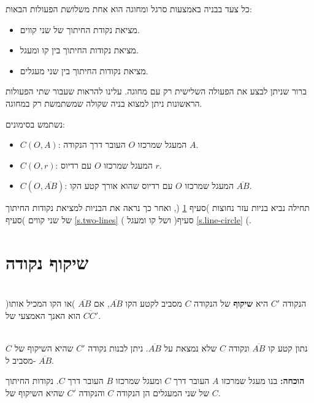 כל צעד בבניה באמצעות סרגל ומחוגה הוא אחת משלושת הפעולות הבאות:
\begin{itemize}
\item
מציאת נקודת החיתוך של שני קווים.
\item
מציאת נקודות החיתוך בין קו ומעגל.
\item
מציאת נקודות החיתוך בין שני מעגלים.
\end{itemize}
ברור שניתן לבצע את הפעולה השלישית רק עם מחוגה. עלינו להראות שעבור שתי הפעולות הראשונות ניתן למצוא בניה שקולה שמשתמשת רק במחוגה.


נשתמש בסימונים:
\begin{itemize}
\item $C(O,A)$: 
המעגל שמרכזו
$O$
העובר דרך הנקודה
$A$.
\item $C(O,r)$:
המעגל שמרכזו
$O$
עם רדיוס
$r$.
\item $C(O,\overline{AB})$:
המעגל שמרכזו
$O$
עם רדיוס שהוא אורך קטע הקו
$\overline{AB}$.
\end{itemize}

תחילה נביא בניות עזר נחוצות )סעיף
\ref{s.auxiliary}%
(,
ואחר כך נראה את הבניות למציאת נקודות החיתוך של שני קווים )סעיף
\ref{s.two-lines}%
( ושל קו ומעגל )סעיף
\ref{s.line-circle}%
(.

\section{שיקוף נקודה}\label{s.auxiliary}

\begin{definition}\mbox{}\\
הנקודה
$C'$
היא
\textbf{%
שיקוף%
}
של הנקודה
$C$
מסביב לקטע הקו
$\overline{AB}$,
אם 
$\overline{AB}$
)או הקו המכיל אותו( הוא האנך האמצעי של
$\overline{CC'}$.
\end{definition}



\begin{theorem}\mbox{}\label{thm.reflection}\\
נתון קטע קו
$\overline{AB}$
ונקודה 
$C$
שלא נמצאת על
$\overline{AB}$.
ניתן לבנות נקודה 
$C'$
שהיא השיקוף של
$C$
מסביב ל-%
$\overline{AB}$.
\end{theorem}

\textbf{הוכחה:}
בנו מעגל שמרכזו
$A$
העובר דרך
$C$
ומעגל שמרכזו
$B$
העובר דרך
$C$.
נקודות החיתוך של שני המעגלים הן הנקודה
$C$
והנקודה
$C'$
שהיא השיקוף של
$C$.



